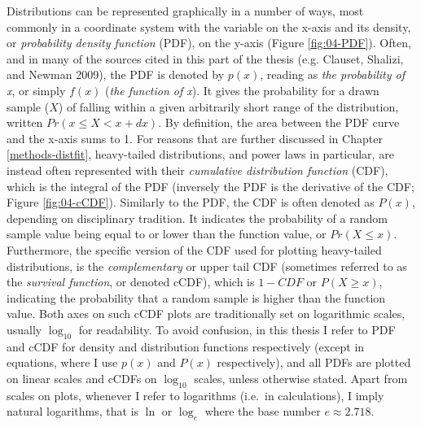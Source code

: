 \documentclass[
  12pt,
]{book}
\begin{document}
Distributions can be represented graphically in a number of ways, most commonly in a coordinate system with the variable on the x-axis and its density, or \emph{probability density function} (PDF), on the y-axis (Figure \ref{fig:04-PDF}). Often, and in many of the sources cited in this part of the thesis (e.g. Clauset, Shalizi, and Newman 2009), the PDF is denoted by \(p(x)\), reading as \emph{the probability of x}, or simply \(f(x)\) (\emph{the function of x}). It gives the probability for a drawn sample (\(X\)) of falling within a given arbitrarily short range of the distribution, written \(Pr(x \le X < x+dx)\). By definition, the area between the PDF curve and the x-axis sums to 1. For reasons that are further discussed in Chapter \ref{methods-distfit}, heavy-tailed distributions, and power laws in particular, are instead often represented with their \emph{cumulative distribution function} (CDF), which is the integral of the PDF (inversely the PDF is the derivative of the CDF; Figure \ref{fig:04-cCDF}). Similarly to the PDF, the CDF is often denoted as \(P(x)\), depending on disciplinary tradition. It indicates the probability of a random sample value being equal to or lower than the function value, or \(Pr(X \le x)\). Furthermore, the specific version of the CDF used for plotting heavy-tailed distributions, is the \emph{complementary} or upper tail CDF (sometimes referred to as the \emph{survival function}, or denoted cCDF), which is \(1-CDF\) or \(P(X \ge x)\), indicating the probability that a random sample is higher than the function value. Both axes on such cCDF plots are traditionally set on logarithmic scales, usually \(\log_{10}\) for readability. To avoid confusion, in this thesis I refer to PDF and cCDF for density and distribution functions respectively (except in equations, where I use \(p(x)\) and \(P(x)\) respectively), and all PDFs are plotted on linear scales and cCDFs on \(\log_{10}\) scales, unless otherwise stated. Apart from scales on plots, whenever I refer to logarithms (i.e.~in calculations), I imply natural logarithms, that is \(\ln\) or \(\log_e\) where the base number \(e \approx 2.718\).
\end{document}
